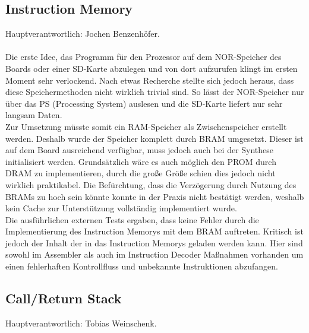\documentclass[bibliography=totoc,listof=totoc,index=totoc]{scrartcl}
\begin{document}
\subsection{Instruction Memory}
Hauptverantwortlich: Jochen Benzenhöfer.\\\\
Die erste Idee, das Programm für den Prozessor auf dem NOR-Speicher des Boards oder einer SD-Karte abzulegen und von dort aufzurufen klingt im ersten Moment sehr verlockend. Nach etwas Recherche stellte sich jedoch heraus, dass diese Speichermethoden nicht wirklich trivial sind. So lässt der NOR-Speicher nur über das PS (Processing System) auslesen und die SD-Karte liefert nur sehr langsam Daten. \\
Zur Umsetzung müsste somit ein RAM-Speicher als Zwischenspeicher erstellt werden. Deshalb wurde der Speicher komplett durch BRAM umgesetzt. Dieser ist auf dem Board ausreichend verfügbar, muss jedoch auch bei der Synthese initialisiert werden. Grundsätzlich wäre es auch möglich den PROM durch DRAM zu implementieren, durch die große Größe schien dies jedoch nicht wirklich praktikabel. Die Befürchtung, dass die Verzögerung durch Nutzung des BRAMs zu hoch sein könnte konnte in der Praxis nicht bestätigt werden, weshalb kein Cache zur Unterstützung vollständig implementiert wurde. \\
Die ausführlichen externen Tests ergaben, dass keine Fehler durch die Implementierung des Instruction Memorys mit dem BRAM auftreten. Kritisch ist jedoch der Inhalt der in das Instruction Memorys geladen werden kann. Hier sind sowohl im Assembler als auch im Instruction Decoder Maßnahmen vorhanden um einen fehlerhaften Kontrollfluss und unbekannte Instruktionen abzufangen. 

\subsection{Call/Return Stack}
Hauptverantwortlich: Tobias Weinschenk. \\
\end{document}
